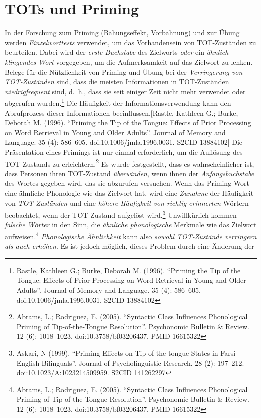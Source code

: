 \documentclass[
  letterpaper,
]{scrbook}
\begin{document}
\hypertarget{tots-und-priming}{%
\section{TOTs und Priming}\label{tots-und-priming}}

In der Forschung zum Priming (Bahungseffekt, Vorbahnung) und zur Übung
werden \emph{Einzelworttests} verwendet, um das Vorhandensein von
TOT-Zuständen zu beurteilen. Dabei wird der \emph{erste Buchstabe} des
Zielworts \emph{oder} ein \emph{ähnlich klingendes Wort} vorgegeben, um
die Aufmerksamkeit auf das Zielwort zu lenken. Belege für die
Nützlichkeit von Priming und Übung bei der \emph{Verringerung von
TOT-Zuständen} sind, dass die meisten Informationen in TOT-Zuständen
\emph{niedrigfrequent} sind, d.~h., dass sie seit einiger Zeit nicht
mehr verwendet oder abgerufen wurden.\footnote{Rastle, Kathleen G.;
  Burke, Deborah M. (1996). ``Priming the Tip of the Tongue: Effects of
  Prior Processing on Word Retrieval in Young and Older Adults''.
  Journal of Memory and Language. 35 (4): 586--605.
  doi:10.1006/jmla.1996.0031. S2CID 13884102} Die Häufigkeit der
Informationsverwendung kann den Abrufprozess dieser Informationen
beeinflussen.{[}Rastle, Kathleen G.; Burke, Deborah M. (1996). ``Priming
the Tip of the Tongue: Effects of Prior Processing on Word Retrieval in
Young and Older Adults''. Journal of Memory and Language. 35 (4):
586--605. doi:10.1006/jmla.1996.0031. S2CID 13884102{]} Die Präsentation
eines Primings ist nur einmal erforderlich, um die Auflösung des
TOT-Zustands zu erleichtern.\footnote{Abrams, L.; Rodriguez, E. (2005).
  ``Syntactic Class Influences Phonological Priming of Tip-of-the-Tongue
  Resolution''. Psychonomic Bulletin \& Review. 12 (6): 1018--1023.
  doi:10.3758/bf03206437. PMID 16615322} Es wurde festgestellt, dass es
wahrscheinlicher ist, dass Personen ihren TOT-Zustand \emph{überwinden},
wenn ihnen der \emph{Anfangsbuchstabe} des Wortes gegeben wird, das sie
abzurufen versuchen. Wenn das Priming-Wort eine ähnliche Phonologie wie
das Zielwort hat, wird eine \emph{Zunahme} der Häufigkeit von
\emph{TOT-Zuständen} und eine \emph{höhere Häufigkeit von richtig
erinnerten} Wörtern beobachtet, wenn der TOT-Zustand aufgelöst
wird.\footnote{Askari, N (1999). ``Priming Effects on Tip-of-the-tongue
  States in Farsi-English Bilinguals''. Journal of Psycholinguistic
  Research. 28 (2): 197--212. doi:10.1023/A:1023214509959. S2CID
  141262297} Unwillkürlich kommen \emph{falsche Wörter} in den Sinn, die
\emph{ähnliche phonologische} Merkmale wie das Zielwort
aufweisen.\footnote{Abrams, L.; Rodriguez, E. (2005). ``Syntactic Class
  Influences Phonological Priming of Tip-of-the-Tongue Resolution''.
  Psychonomic Bulletin \& Review. 12 (6): 1018--1023.
  doi:10.3758/bf03206437. PMID 16615322} \emph{Phonologische
Ähnlichkeit} kann also \emph{sowohl TOT-Zustände verringern als auch
erhöhen}. Es ist jedoch möglich, dieses Problem durch eine Änderung der
\end{document}
